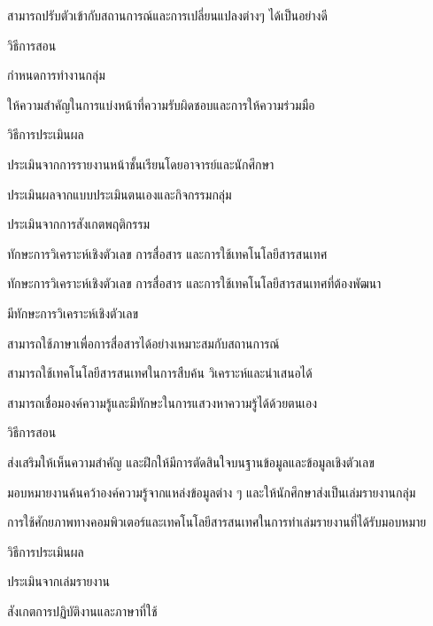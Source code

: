 \begin{edudev}
\begin{enumdev}
\begin{subenumdev}
						\item \withwc สามารถปรับตัวเข้ากับสถานการณ์และการเปลี่ยนแปลงต่างๆ ได้เป็นอย่างดี
					\end{subenumdev}
			\item วิธีการสอน
					\begin{subenumdev}
						\item กำหนดการทำงานกลุ่ม
						\item ให้ความสำคัญในการแบ่งหน้าที่ความรับผิดชอบและการให้ความร่วมมือ
					\end{subenumdev}
			\item วิธีการประเมินผล
					\begin{subenumdev}
						\item ประเมินจากการรายงานหน้าชั้นเรียนโดยอาจารย์และนักศึกษา
						\item ประเมินผลจากแบบประเมินตนเองและกิจกรรมกลุ่ม
						\item ประเมินจากการสังเกตพฤติกรรม
					\end{subenumdev}
		\end{enumdev}
\item ทักษะการวิเคราะห์เชิงตัวเลข การสื่อสาร และการใช้เทคโนโลยีสารสนเทศ
		\begin{enumdev}
			\item ทักษะการวิเคราะห์เชิงตัวเลข การสื่อสาร และการใช้เทคโนโลยีสารสนเทศที่ต้องพัฒนา
					\begin{subenumdev}
						\item \withbc มีทักษะการวิเคราะห์เชิงตัวเลข
						\item \withwc สามารถใช้ภาษาเพื่อการสื่อสารได้อย่างเหมาะสมกับสถานการณ์
						\item \withwc สามารถใช้เทคโนโลยีสารสนเทศในการสืบค้น วิเคราะห์และนำเสนอได้
						\item \withwc สามารถเชื่อมองค์ความรู้และมีทักษะในการแสวงหาความรู้ได้ด้วยตนเอง
					\end{subenumdev}
			\item วิธีการสอน
					\begin{subenumdev}
						\item ส่งเสริมให้เห็นความสำคัญ และฝึกให้มีการตัดสินใจบนฐานข้อมูลและข้อมูลเชิงตัวเลข
						\item มอบหมายงานค้นคว้าองค์ความรู้จากแหล่งข้อมูลต่าง ๆ และให้นักศึกษาส่งเป็นเล่มรายงานกลุ่ม
						\item การใช้ศักยภาพทางคอมพิวเตอร์และเทคโนโลยีสารสนเทศในการทำเล่มรายงานที่ได้รับมอบหมาย
					\end{subenumdev}
			\item วิธีการประเมินผล	
					\begin{subenumdev}
						\item ประเมินจากเล่มรายงาน
						\item สังเกตการปฏิบัติงานและภาษาที่ใช้
					\end{subenumdev}
		\end{enumdev}
\end{edudev}

